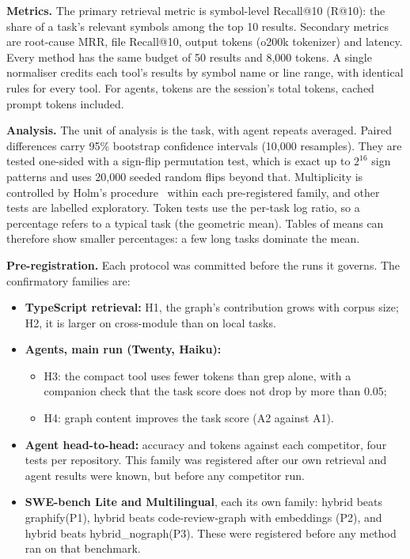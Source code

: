 \documentclass[sigconf,nonacm]{acmart}
\makeatletter
\newcommand{\gfy}{graphify\xspace}
\newcommand{\crg}{code-review-graph\xspace}
\newcommand{\hyb}{\textsf{hybrid}\xspace}
\newcommand{\nog}{\textsf{hybrid\_nograph}\xspace}
\newcommand{\cmp}{\textsf{compact}\xspace}
\newcommand{\rat}{R@10\xspace}
\makeatother
\begin{document}
\textbf{Metrics.} The primary retrieval metric is symbol-level Recall@10 (\rat): the share of a task's relevant symbols among the top 10 results. Secondary metrics are root-cause MRR, file Recall@10, output tokens (o200k tokenizer) and latency. Every method has the same budget of 50 results and 8,000 tokens. A single normaliser credits each tool's results by symbol name or line range, with identical rules for every tool. For agents, tokens are the session's total tokens, cached prompt tokens included.

\textbf{Analysis.} The unit of analysis is the task, with agent repeats averaged. Paired differences carry 95\% bootstrap confidence intervals (10,000 resamples). They are tested one-sided with a sign-flip permutation test, which is exact up to $2^{16}$ sign patterns and uses 20,000 seeded random flips beyond that. Multiplicity is controlled by Holm's procedure~\cite{holm1979} within each pre-registered family, and other tests are labelled exploratory. Token tests use the per-task log ratio, so a percentage refers to a typical task (the geometric mean). Tables of means can therefore show smaller percentages: a few long tasks dominate the mean.

\textbf{Pre-registration.} Each protocol was committed before the runs it governs. The confirmatory families are:
\begin{itemize}
\item \textbf{TypeScript retrieval:} H1, the graph's contribution grows with corpus size; H2, it is larger on cross-module than on local tasks.
\item \textbf{Agents, main run (Twenty, Haiku):}
  \begin{itemize}
  \item H3: the \cmp tool uses fewer tokens than grep alone, with a companion check that the task score does not drop by more than 0.05;
  \item H4: graph content improves the task score (A2 against A1).
  \end{itemize}
\item \textbf{Agent head-to-head:} accuracy and tokens against each competitor, four tests per repository. This family was registered after our own retrieval and agent results were known, but before any competitor run.
\item \textbf{SWE-bench Lite and Multilingual}, each its own family: \hyb beats \gfy (P1), \hyb beats \crg with embeddings (P2), and \hyb beats \nog (P3). These were registered before any method ran on that benchmark.
\end{itemize}
\end{document}
